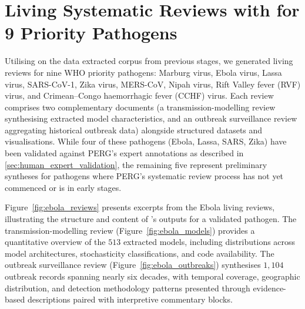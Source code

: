 \clearpage
\section{Living Systematic Reviews with \name{} for 9 Priority Pathogens}\label{app:report_writeup}

Utilising \name{} on the data extracted corpus from previous stages, we generated living reviews for nine WHO priority pathogens: Marburg virus, Ebola virus, Lassa virus, SARS-CoV-1, Zika virus, MERS-CoV, Nipah virus, Rift Valley fever (RVF) virus, and Crimean--Congo haemorrhagic fever (CCHF) virus. Each review comprises two complementary documents (a transmission-modelling review synthesising extracted model characteristics, and an outbreak surveillance review aggregating historical outbreak data) alongside structured datasets and visualisations. While four of these pathogens (Ebola, Lassa, SARS, Zika) have been validated against PERG's expert annotations as described in \cref{sec:human_expert_validation}, the remaining five represent preliminary syntheses for pathogens where PERG's systematic review process has not yet commenced or is in early stages.

Figure~\ref{fig:ebola_reviews} presents excerpts from the Ebola living reviews, illustrating the structure and content of \name{}'s outputs for a validated pathogen. The transmission-modelling review (Figure~\ref{fig:ebola_models}) provides a quantitative overview of the $513$ extracted models, including distributions across model architectures, stochasticity classifications, and code availability. The outbreak surveillance review (Figure~\ref{fig:ebola_outbreaks}) synthesises $1,104$ outbreak records spanning nearly six decades, with temporal coverage, geographic distribution, and detection methodology patterns presented through evidence-based descriptions paired with interpretive commentary blocks.

